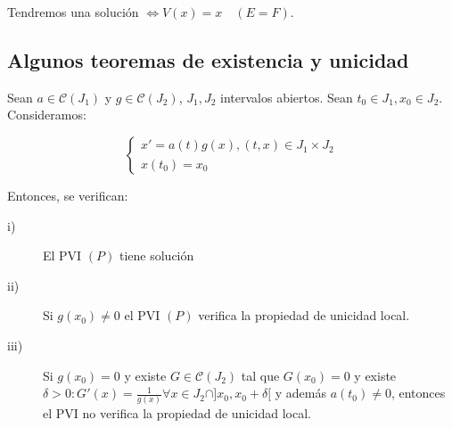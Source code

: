 \documentclass{article}
\begin{document}
  Tendremos una solución $\Leftrightarrow V(x) = x \quad (E=F)$.

  \subsection{Algunos teoremas de existencia y unicidad}

\begin{thm}
  Sean $ a \in \mathcal{C}(J_1)$ y $g \in \mathcal{C}(J_2)$,
  $J_1, J_2$ intervalos abiertos.  Sean $t_0 \in J_1, x_0 \in
  J_2$. Consideramos:

\begin{equation}
  \left\{
    \begin{array}{l}
      x' = a(t)g(x), (t,x) \in J_1 \times J_2 \\
      x(t_0) = x_0
    \end{array}
  \right.
  \tag{P}
\end{equation}

Entonces, se verifican:
\begin{description}
\item[i)] El PVI $(P)$ tiene solución
\item[ii)] Si $g(x_0) \neq 0$ el PVI $(P)$ verifica la propiedad de
  unicidad local.
\item[iii)] Si $g(x_0) = 0$ y existe $ G \in \mathcal{C} (J_2)$ tal
  que $G(x_0) = 0$ y existe
  $\delta > 0: G'(x) = \frac{1}{g(x)} \forall x \in J_2 \cap ]x_0, x_0
  + \delta[$
  y además $a(t_0) \neq 0$, entonces el PVI no verifica la propiedad
  de unicidad local.
\end{description}
\end{thm}
\end{document}
